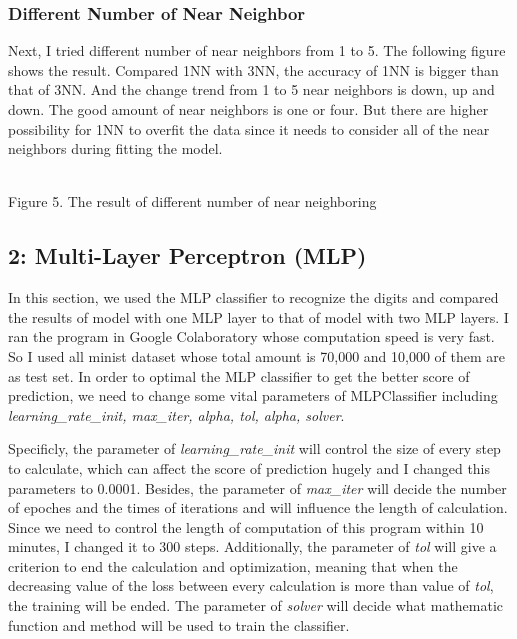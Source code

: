 \documentclass[11pt]{article}
\begin{document}
\subsubsection{Different Number of Near
Neighbor}\label{different-number-of-near-neighbor}

Next, I tried different number of near neighbors from 1 to 5. The
following figure shows the result. Compared 1NN with 3NN, the accuracy
of 1NN is bigger than that of 3NN. And the change trend from 1 to 5 near
neighbors is down, up and down. The good amount of near neighbors is one
or four. But there are higher possibility for 1NN to overfit the data
since it needs to consider all of the near neighbors during fitting the
model.

\\
Figure 5. The result of different number of near neighboring

\subsection{\texorpdfstring{\textbf{2: Multi-Layer Perceptron
(MLP)}}{2: Multi-Layer Perceptron (MLP)}}\label{multi-layer-perceptron-mlp}

In this section, we used the MLP classifier to recognize the digits and
compared the results of model with one MLP layer to that of model with
two MLP layers. I ran the program in Google Colaboratory whose
computation speed is very fast. So I used all minist dataset whose total
amount is 70,000 and 10,000 of them are as test set. In order to optimal
the MLP classifier to get the better score of prediction, we need to
change some vital parameters of MLPClassifier including
\emph{learning\_rate\_init, max\_iter, alpha, tol, alpha, solver}.

Specificly, the parameter of \emph{learning\_rate\_init} will control
the size of every step to calculate, which can affect the score of
prediction hugely and I changed this parameters to 0.0001. Besides, the
parameter of \emph{max\_iter} will decide the number of epoches and the
times of iterations and will influence the length of calculation. Since
we need to control the length of computation of this program within 10
minutes, I changed it to 300 steps. Additionally, the parameter of
\emph{tol} will give a criterion to end the calculation and
optimization, meaning that when the decreasing value of the loss between
every calculation is more than value of \emph{tol}, the training will be
ended. The parameter of \emph{solver} will decide what mathematic
function and method will be used to train the classifier.
\end{document}
